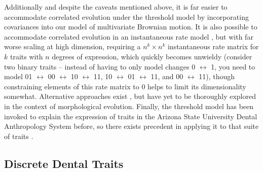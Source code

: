 Additionally and despite the caveats mentioned above, it is far easier to accommodate correlated evolution under the threshold model by incorporating covariances into our model of multivariate Brownian motion. It is also possible to accommodate correlated evolution in an instantaneous rate model \citep{pagelDetectingCorrelatedEvolution1994, pagelBayesianAnalysisCorrelated2006}, but with far worse scaling at high dimension, requiring a $n^k \times n^k$ instantaneous rate matrix for $k$ traits with $n$ degrees of expression, which quickly becomes unwieldy (consider two binary traits – instead of having to only model changes 0 $\leftrightarrow$ 1, you need to model 01 $\leftrightarrow$ 00 $\leftrightarrow$ 10 $\leftrightarrow$ 11, 10 $\leftrightarrow$ 01 $\leftrightarrow$ 11, and 00 $\leftrightarrow$ 11), though constraining elements of this rate matrix to 0 helps to limit its dimensionality somewhat. Alternative approaches exist \citep{robinsonProteinEvolutionDependence2003, rodrigueSiteInterdependenceAttributed2005, rodrigueAssessingSiteinterdependentPhylogenetic2006}, but have yet to be thoroughly explored in the context of morphological evolution. Finally, the threshold model has been invoked to explain the expression of traits in the Arizona State University Dental Anthropology System \citep[ASUDAS;][]{turnerScoringProducesKey1991} before, so there exists precedent in applying it to that suite of traits \citep{scottAnthropologyModernHuman2018}.  

\subsection{Discrete Dental Traits}

